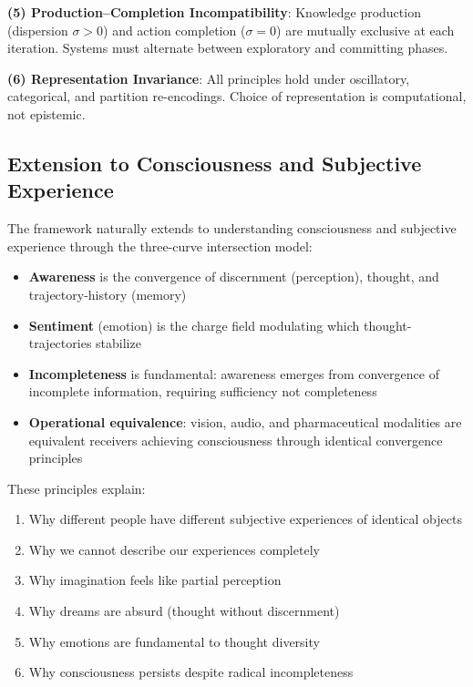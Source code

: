 \documentclass[twocolumn,11pt,a4paper]{article}
\begin{document}
\textbf{(5) Production--Completion Incompatibility}: Knowledge production (dispersion $\sigma>0$) and action completion ($\sigma=0$) are mutually exclusive at each iteration. Systems must alternate between exploratory and committing phases.

\textbf{(6) Representation Invariance}: All principles hold under oscillatory, categorical, and partition re-encodings. Choice of representation is computational, not epistemic.

\subsection{Extension to Consciousness and Subjective Experience}

The framework naturally extends to understanding consciousness and subjective experience through the three-curve intersection model:

\begin{itemize}
\item \textbf{Awareness} is the convergence of discernment (perception), thought, and trajectory-history (memory)
\item \textbf{Sentiment} (emotion) is the charge field modulating which thought-trajectories stabilize
\item \textbf{Incompleteness} is fundamental: awareness emerges from convergence of incomplete information, requiring sufficiency not completeness
\item \textbf{Operational equivalence}: vision, audio, and pharmaceutical modalities are equivalent receivers achieving consciousness through identical convergence principles
\end{itemize}

These principles explain:
\begin{enumerate}[label=(\arabic*),leftmargin=*]
\item Why different people have different subjective experiences of identical objects
\item Why we cannot describe our experiences completely
\item Why imagination feels like partial perception
\item Why dreams are absurd (thought without discernment)
\item Why emotions are fundamental to thought diversity
\item Why consciousness persists despite radical incompleteness
\end{enumerate}
\end{document}
